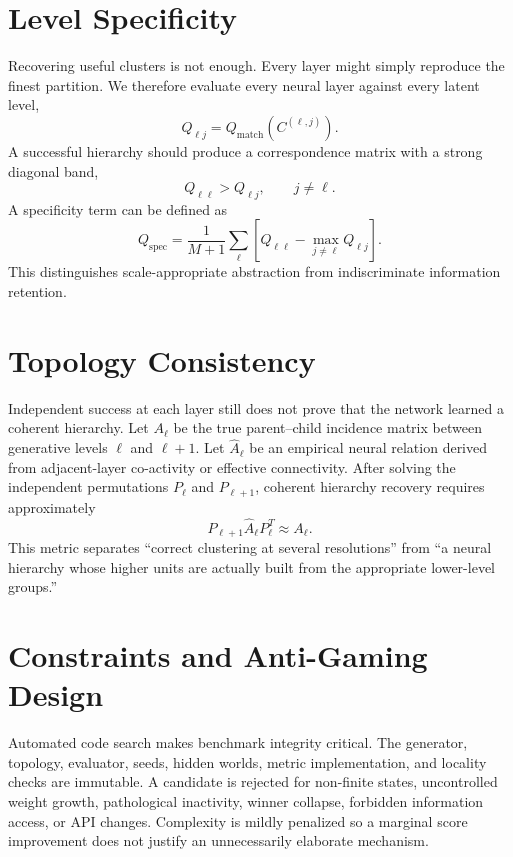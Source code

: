 \documentclass[11pt]{article}
\begin{document}
\section{Level Specificity}
Recovering useful clusters is not enough. Every layer might simply reproduce the finest partition. We therefore evaluate every neural layer against every latent level,
\begin{equation}
Q_{\ell j}=Q_{\mathrm{match}}\!\left(C^{(\ell,j)}\right).
\end{equation}
A successful hierarchy should produce a correspondence matrix with a strong diagonal band,
\begin{equation}
Q_{\ell\ell} > Q_{\ell j},\qquad j\neq \ell.
\end{equation}
A specificity term can be defined as
\begin{equation}
Q_{\mathrm{spec}}=\frac{1}{M+1}\sum_\ell\left[Q_{\ell\ell}-\max_{j\neq\ell}Q_{\ell j}\right].
\end{equation}
This distinguishes scale-appropriate abstraction from indiscriminate information retention.

\section{Topology Consistency}
Independent success at each layer still does not prove that the network learned a coherent hierarchy. Let $A_\ell$ be the true parent--child incidence matrix between generative levels $\ell$ and $\ell+1$. Let $\widehat A_\ell$ be an empirical neural relation derived from adjacent-layer co-activity or effective connectivity. After solving the independent permutations $P_\ell$ and $P_{\ell+1}$, coherent hierarchy recovery requires approximately
\begin{equation}
P_{\ell+1}\widehat A_\ell P_\ell^T \approx A_\ell.
\end{equation}
This metric separates ``correct clustering at several resolutions'' from ``a neural hierarchy whose higher units are actually built from the appropriate lower-level groups.''

\section{Constraints and Anti-Gaming Design}
Automated code search makes benchmark integrity critical. The generator, topology, evaluator, seeds, hidden worlds, metric implementation, and locality checks are immutable. A candidate is rejected for non-finite states, uncontrolled weight growth, pathological inactivity, winner collapse, forbidden information access, or API changes. Complexity is mildly penalized so a marginal score improvement does not justify an unnecessarily elaborate mechanism.
\end{document}
